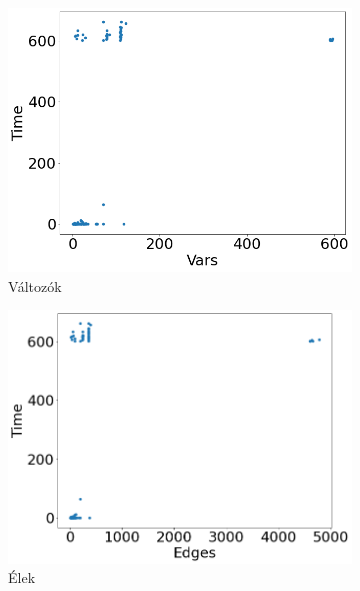 \begin{figure}[ht] 
	\begin{subfigure}[b]{0.5\linewidth}
		\centering
		\includegraphics[width=0.95\linewidth]{figures/plc/vars.png} 
		\caption{Változók} 
		\vspace{4ex}
	\end{subfigure}%
	\begin{subfigure}[b]{0.5\linewidth}
		\centering
		\includegraphics[width=0.95\linewidth]{figures/plc/edges.png} 
		\caption{Élek} 
		\vspace{4ex}
	\end{subfigure} 
	\begin{subfigure}[b]{0.5\linewidth}
		\centering

\end{subfigure}
\end{figure}
